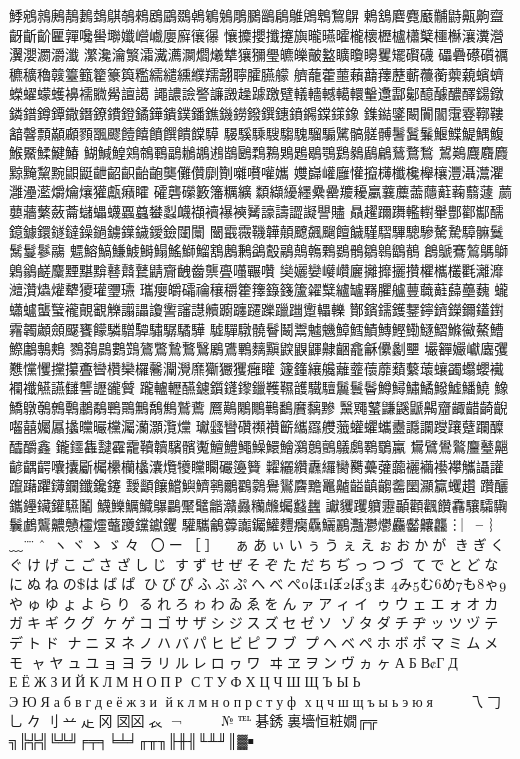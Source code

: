 鯚鵷鶁鶊鶄鶈鵱鶀鵸鶆鶋鶌鵽鵫鵴鵵鵰鵩鶅鵳鵻鶂鵯鵹鵿
鶇鵨麔麑黀黼鼭齀齁齍齖齗齘匷嚲嚵嚳壣孅巆巇廮廯忀忁
懹攗攖攕攓旟曨曣曤櫳櫰櫪櫨櫹櫱櫮櫯瀼瀵瀯瀷瀴瀱灂瀸
瀿瀺瀹瀪灀瀻瀳灁爓爔犨獽獼璺皫皪皾盭矌矎矏矍矲礥礣
礧礨礤礩禲穮穬穭竷籉籈籊籇籅糮繻繾纁纀羺翿聹臛臙艨
艩蘢藿蘁藾蘛蘀藶蘄蘉蘅蘌藽蠙蠐蠑蠗蠓蠖襣襦覹觷譠譪
譝譨譣譥譧譭趮躆躈躄轙轖轗轕轘轚邍酃酁醷醵醲醳鐋鐓
鏻鐠鐏鐔鏾鐕鐐鐨鐙鐍鏵鐀鏷鐇鐎鐖鐒鏺鐉鏸鐼鐊鏿鏼鐌
鏶鐑鐆闞闠闟霮霯鞹鞻韽韾顠顢顣顟飁飂饐饎饙饌饋饓騲
騴騱騬騪騶騩騮騸騭髇髊髆鬐鬒鬑鰋鰈鯷鰅鰒鯸鱀鰇鰎鰆
鰗鰔鰉鶟鶙鶤鶝鶒鶘鶐鶛鶠鶔鶜鶪鶗鶡鶚鶢鶨鶞鶣鶿鶩鶖
鶦鶧麙麛麚黥黤黧黦鼰鼮齛齠齞齝齙龑儺儹劘劗囃嚽嚾孈
孇巋巏廱懽攛欂櫼欃櫸欀灃灄灊灈灉灅灆爝爚爙獾甗癪矐
礭礱礯籔籓糲纊纇纈纋纆纍罍羻耰臝蘘蘪蘦蘟蘣蘜蘙蘧
蘮蘡蘠蘩蘞蘥蠩蠝蠛蠠蠤蠜蠫衊襭襩襮襫觺譹譸譅譺譻贐
贔趯躎躌轞轛轝酆酄酅醹鐿鐻鐶鐩鐽鐰鐹鐪鐷鐬鑀鐱闥闤
闣霵霺鞿韡顤飉飆飀饘饖騹騽驆驄驂驁騺騿髍鬕鬗鬘鬖鬺
魒鰫鰝鰜鰬鰣鰨鰩鰤鰡鶷鶶鶼鷁鷇鷊鷏鶾鷅鷃鶻鶵鷎鶹鶺
鶬鷈鶱鶭鷌鶳鷍鶲鹺麜黫黮黭鼛鼘鼚鼱齎齥齤龒亹囆囅囋
奱孋孌巕巑廲攡攠攦攢欋欈欉氍灕灖灗灒爞爟犩獿瓘瓕瓙
瓗癭皭礵禴穰穱籗籜籙籛籚糴糱纑罏羇臞艫蘴蘵蘳蘬蘲蘶
蠬蠨蠦蠪蠥襱覿覾觻譾讄讂讆讅譿贕躕躔躚躒躐躖躗轠轢
酇鑌鑐鑊鑋鑏鑇鑅鑈鑉鑆霿韣顪顩飋饔饛驎驓驔驌驏驈驊
驉驒驐髐鬙鬫鬻魖魕鱆鱈鰿鱄鰹鰳鱁鰼鰷鰴鰲鰽鰶鷛鷒鷞
鷚鷋鷐鷜鷑鷟鷩鷙鷘鷖鷵鷕鷝麶黰鼵鼳鼲齂齫龕龢儽劙壨
壧奲孍巘蠯彏戁戃戄攩攥斖曫欑欒欏毊灛灚爢玂玁玃癰矔
籧籦纕艬蘺虀蘹蘼蘱蘻蘾蠰蠲蠮蠳襶襴襳觾讌讎讋讈豅贙
躘轤轣醼鑢鑕鑝鑗鑞韄韅頀驖驙鬞鬟鬠鱒鱘鱐鱊鱍鱋鱕鱙
鱌鱎鷻鷷鷯鷣鷫鷸鷤鷶鷡鷮鷦鷲鷰鷢鷬鷴鷳鷨鷭黂黐黲
黳鼆鼜鼸鼷鼶齃齏齱齰齮齯囓囍孎屭攭曭曮欓灟灡灝灠爣
瓛瓥矕礸禷禶籪纗羉艭虃蠸蠷蠵衋讔讕躞躟躠躝醾醽釂鑫
鑨鑩雥靆靃靇韇韥驞髕魙鱣鱧鱦鱢鱞鱠鸂鷾鸇鸃鸆鸅鸀鸁
鸉鷿鷽鸄麠鼞齆齴齵齶囔攮斸欘欙欗欚灢爦犪矘矙礹籩籫
糶纚纘纛纙臠臡虆虇虈襹襺襼襻觿讘讙躥躤躣鑮鑭鑯鑱鑳
靉顲饟鱨鱮鱭鸋鸍鸐鸏鸒鸑麡黵鼉齇齸齻齺齹圞灦籯蠼趲
躦釃鑴鑸鑶鑵驠鬮鱴鱳鱱鱵鸔鸓黶鼊龤灨灥糷虪蠾蠽蠿
讞貜躩軉靋顳顴飌饡馫驤驦驧鬤鸕鸗齈戇欞爧虌躨钂钀钁
驩驨鸙虋讟钃鱹麷癵驫鱺鸝灩灪爩麤齾齉龘︙︳╴︴﹏¨
̈ˆ＾ヽヾゝゞ々〆〇ー［］
✽ぁあぃいぅうぇえぉおかが
きぎくぐけげこごさざしじ
すずせぜそぞただちぢっつづ
てでとどなにぬねのはばぱ
ひびぴふぶぷへべぺほぼぽま
みむめもゃやゅゆょよらり
るれろゎわゐゑをんァアィイ
ゥウェエォオカガキギクグ
ケゲコゴサザシジスズセゼソ
ゾタダチヂッツヅテデトド
ナニヌネノハバパヒビピフブ
プヘベペホボポマミムメモ
ャヤュユョヨラリルレロヮワ
ヰヱヲンヴヵヶАБВГД
ЕЁЖЗИЙКЛМНОПР
СТУФХЦЧШЩЪЫЬ
ЭЮЯабвгдеёжзи
йклмнопрстуф
хцчшщъыьэюя⇧↸
↹㇏乁𠃌乚𠂊刂䒑龰冈㘝龱𧘇
¬￢￤＇＂㈱№℡碁銹裏墻恒粧嫺╔╦
╗╠╬╣╚╩╝╒╤╕╘╧╛╓╥╖╟╫╢╙╨╜║▓￭


